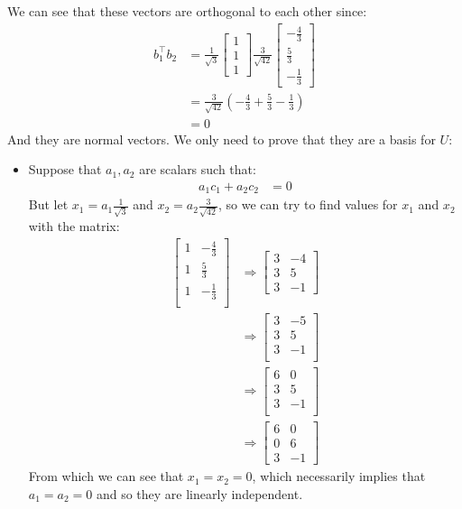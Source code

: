 \documentclass[final,expand]{problemset}
\begin{document}
{	We can see that these vectors are orthogonal to each other since:
	\begin{align*}
		b_1^\top b_2 &=\frac{1}{\sqrt{3}}\begin{bmatrix}
			1 \\ 1\\ 1
		\end{bmatrix} \frac{3}{\sqrt{42}} \begin{bmatrix}
			-\frac{4}{3} \\ \frac{5}{3} \\ -\frac{1}{3}
		\end{bmatrix}\\
		&= \frac{3}{\sqrt{42}} (-\frac{4}{3} + \frac{5}{3} - \frac{1}{3})\\
		&= 0
	\end{align*}
	And they are normal vectors. We only need to prove that they are a basis for $U$:
	\begin{itemize}
		\item Suppose that $a_1, a_2$ are scalars such that:
		\begin{align*}
			a_1c_1 + a_2c_2 &= 0
		\end{align*}
		But let $x_1 = a_1\frac{1}{\sqrt{3}}$ and $x_2 = a_2\frac{3}{\sqrt{42}}$, so we can try to find values for $x_1$ and $x_2$ with the matrix:
		\begin{align*}
			\begin{bmatrix}
				1 & -\frac{4}{3}\\
				1 & \frac{5}{3}\\
				1 & -\frac{1}{3}\\
			\end{bmatrix} &\Rightarrow \begin{bmatrix}
				3 & -4\\
				3 & 5\\
				3 & -1
			\end{bmatrix}\\
			&\Rightarrow \begin{bmatrix}
				3 & -5\\
				3 & 5\\
				3 & -1\\
			\end{bmatrix}\\
			&\Rightarrow\begin{bmatrix}
				6 & 0\\
				3 & 5\\
				3 & -1\\
			\end{bmatrix}\\
			&\Rightarrow\begin{bmatrix}
				6 & 0\\
				0 & 6\\
				3 & -1
			\end{bmatrix}
		\end{align*}
		From which we can see that $x_1 = x_2 = 0$, which necessarily implies that $a_1 = a_2 = 0$ and so they are linearly independent.


\end{itemize}}
\end{document}
